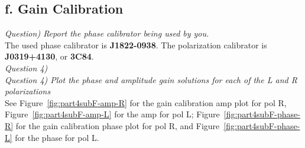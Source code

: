 \documentclass[12pt, a4paper]{article}
\begin{document}


\subsection{f. Gain Calibration}
\noindent \textit{Question) Report the phase calibrator being used by you.} \\
The used phase calibrator is \textbf{J1822-0938}. The polarization calibrator is \textbf{J0319+4130}, or \textbf{3C84}.\\


% 
% 
% 
\noindent \textit{Question 4) } \\
% 
% 
% 
% 
% 
\noindent \textit{Question 4) Plot the phase and amplitude gain solutions for each of the L and R polarizations} \\
See Figure~\ref{fig:part4subF-amp-R} for the gain calibration amp plot for pol R, Figure~\ref{fig:part4subF-amp-L} for the amp for pol L; Figure~\ref{fig:part4subF-phase-R} for the gain calibration phase plot for pol R, and Figure~\ref{fig:part4subF-phase-L} for the phase for pol L.
\end{document}
